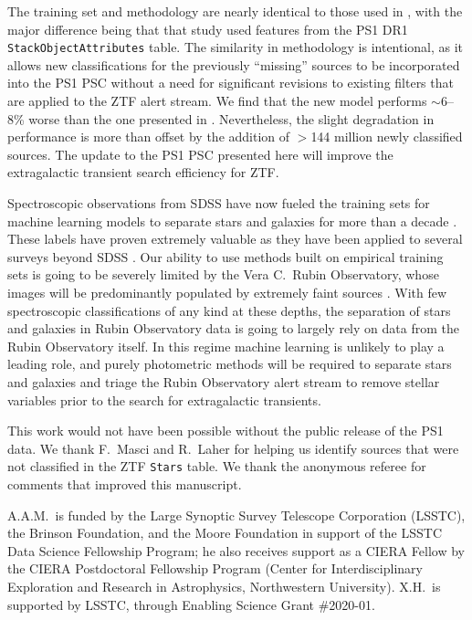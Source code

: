 \documentclass[twocolumn]{aastex63}
\begin{document}
The training set and methodology are nearly identical to those used in
\citet{Tachibana18}, with the major difference being that that study used
features from the PS1 DR1 \texttt{StackObjectAttributes} table. The similarity
in methodology is intentional, as it allows new classifications for the
previously ``missing'' sources to be incorporated into the PS1 PSC without a
need for significant revisions to existing filters that are applied to the ZTF
alert stream. We find that the new model performs $\sim$6--8\% worse than the
one presented in \citet[][see Table~\ref{tbl:thresh}]{Tachibana18}.
Nevertheless, the slight degradation in performance is more than offset by the
addition of $>$144 million newly classified sources. The update to the PS1 PSC
presented here will improve the extragalactic transient search efficiency for
ZTF.

Spectroscopic observations from SDSS have now fueled the training sets for
machine learning models to separate stars and galaxies for more than a decade
\citep[e.g.,][]{Ball06,Beck20}. These labels have proven extremely valuable as
they have been applied to several surveys beyond SDSS
\citep[e.g.,][]{Miller17,Beck20}. Our ability to use methods built on
empirical training sets is going to be severely limited by the Vera C.\ Rubin
Observatory, whose images will be predominantly populated by extremely faint
sources \citep[$r \approx 24$\,mag;][]{Ivezic19}. With few spectroscopic
classifications of any kind at these depths, the separation of stars and
galaxies in Rubin Observatory data is going to largely rely on data from the
Rubin Observatory itself. In this regime machine learning is unlikely to play
a leading role, and purely photometric methods will be required to separate
stars and galaxies \citep[e.g.,][]{Slater20} and triage the Rubin Observatory
alert stream to remove stellar variables prior to the search for extragalactic
transients.

\acknowledgments

This work would not have been possible without the public release of the PS1
data. We thank F.~Masci and R.~Laher for helping us identify sources that were
not classified in the ZTF \texttt{Stars} table. We thank the anonymous referee for comments that improved this manuscript. 

A.A.M.~is funded by the Large Synoptic Survey Telescope Corporation (LSSTC),
the Brinson Foundation, and the Moore Foundation in support of the LSSTC Data
Science Fellowship Program; he also receives support as a CIERA Fellow by the
CIERA Postdoctoral Fellowship Program (Center for Interdisciplinary
Exploration and Research in Astrophysics, Northwestern University). X.H.~is
supported by LSSTC, through Enabling Science Grant \#2020-01.
\end{document}
